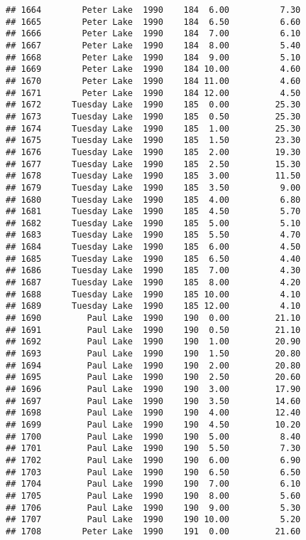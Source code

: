 \documentclass[
]{article}
\begin{document}
\begin{verbatim}
## 1664        Peter Lake  1990    184  6.00          7.30
## 1665        Peter Lake  1990    184  6.50          6.60
## 1666        Peter Lake  1990    184  7.00          6.10
## 1667        Peter Lake  1990    184  8.00          5.40
## 1668        Peter Lake  1990    184  9.00          5.10
## 1669        Peter Lake  1990    184 10.00          4.60
## 1670        Peter Lake  1990    184 11.00          4.60
## 1671        Peter Lake  1990    184 12.00          4.50
## 1672      Tuesday Lake  1990    185  0.00         25.30
## 1673      Tuesday Lake  1990    185  0.50         25.30
## 1674      Tuesday Lake  1990    185  1.00         25.30
## 1675      Tuesday Lake  1990    185  1.50         23.30
## 1676      Tuesday Lake  1990    185  2.00         19.30
## 1677      Tuesday Lake  1990    185  2.50         15.30
## 1678      Tuesday Lake  1990    185  3.00         11.50
## 1679      Tuesday Lake  1990    185  3.50          9.00
## 1680      Tuesday Lake  1990    185  4.00          6.80
## 1681      Tuesday Lake  1990    185  4.50          5.70
## 1682      Tuesday Lake  1990    185  5.00          5.10
## 1683      Tuesday Lake  1990    185  5.50          4.70
## 1684      Tuesday Lake  1990    185  6.00          4.50
## 1685      Tuesday Lake  1990    185  6.50          4.40
## 1686      Tuesday Lake  1990    185  7.00          4.30
## 1687      Tuesday Lake  1990    185  8.00          4.20
## 1688      Tuesday Lake  1990    185 10.00          4.10
## 1689      Tuesday Lake  1990    185 12.00          4.10
## 1690         Paul Lake  1990    190  0.00         21.10
## 1691         Paul Lake  1990    190  0.50         21.10
## 1692         Paul Lake  1990    190  1.00         20.90
## 1693         Paul Lake  1990    190  1.50         20.80
## 1694         Paul Lake  1990    190  2.00         20.80
## 1695         Paul Lake  1990    190  2.50         20.60
## 1696         Paul Lake  1990    190  3.00         17.90
## 1697         Paul Lake  1990    190  3.50         14.60
## 1698         Paul Lake  1990    190  4.00         12.40
## 1699         Paul Lake  1990    190  4.50         10.20
## 1700         Paul Lake  1990    190  5.00          8.40
## 1701         Paul Lake  1990    190  5.50          7.30
## 1702         Paul Lake  1990    190  6.00          6.90
## 1703         Paul Lake  1990    190  6.50          6.50
## 1704         Paul Lake  1990    190  7.00          6.10
## 1705         Paul Lake  1990    190  8.00          5.60
## 1706         Paul Lake  1990    190  9.00          5.30
## 1707         Paul Lake  1990    190 10.00          5.20
## 1708        Peter Lake  1990    191  0.00         21.60

\end{verbatim}
\end{document}
